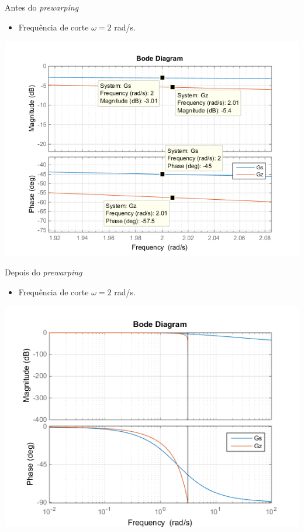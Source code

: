 \begin{frame}{\MATLAB}
\begin{block}{Antes do \textit{prewarping}}
\begin{itemize}
    \item Frequência de corte $\omega = 2$ rad/s.
\end{itemize}
\end{block}
\centerline{\includegraphics[width=0.7\linewidth]{Figuras/Ch08/fig6.png}}
\end{frame}

\begin{frame}{\MATLAB}
\begin{block}{Depois do \textit{prewarping}}
\begin{itemize}
    \item Frequência de corte $\omega = 2$ rad/s.
\end{itemize}
\end{block}
\centerline{\includegraphics[width=0.7\linewidth]{Figuras/Ch08/fig7.png}}
\end{frame}

